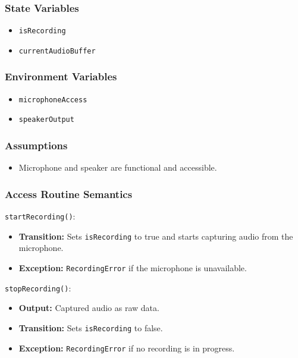 \documentclass[12pt, titlepage]{article}
\begin{document}
\subsubsection{State Variables}  
\begin{itemize}  
    \item \texttt{isRecording}  
    \item \texttt{currentAudioBuffer}  
\end{itemize}  

\subsubsection{Environment Variables}  
\begin{itemize}  
    \item \texttt{microphoneAccess}  
    \item \texttt{speakerOutput}  
\end{itemize}  

\subsubsection{Assumptions}  
\begin{itemize}  
    \item Microphone and speaker are functional and accessible.  
\end{itemize}  

\subsubsection{Access Routine Semantics}  

\noindent \texttt{startRecording()}:
\begin{itemize}  
    \item \textbf{Transition:} Sets \texttt{isRecording} to true and starts capturing audio from the microphone.  
    \item \textbf{Exception:} \texttt{RecordingError} if the microphone is unavailable.  
\end{itemize}  

\noindent \texttt{stopRecording()}:
\begin{itemize}  
    \item \textbf{Output:} Captured audio as raw data.  
    \item \textbf{Transition:} Sets \texttt{isRecording} to false.  
    \item \textbf{Exception:} \texttt{RecordingError} if no recording is in progress.  
\end{itemize}  
\end{document}
